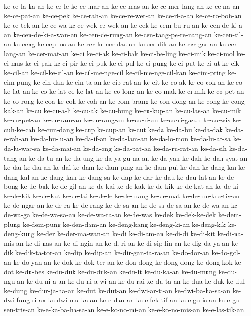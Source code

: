 {ke-ce-la-ka-an ke-ce-le ke-ce-mar-an ke-ce-mas-an ke-ce-mer-lang-an
ke-ce-na-an ke-ce-pat-an ke-ce-pek ke-ce-rah-an ke-ce-re-wet-an
ke-ce-ri-a-an ke-ce-ro-boh-an ke-ce-tek-an ke-ce-wa ke-ce-wek-ce-wek-an
ke-cek ke-cem-bu-ru-an ke-cen-de-ki-a-an ke-cen-de-ki-a-wan-an
ke-cen-de-rung-an ke-cen-tang-pe-re-nang-an ke-cen-til-an ke-ceng
ke-cep-los-an ke-cer ke-cer-das-an ke-cer-dik-an ke-cer-gas-an
ke-cer-lang-an ke-cer-mat-an ke-ci ke-ci-ak ke-ci-bak ke-ci-be-ling
ke-ci-mik ke-ci-mol ke-ci-mus ke-ci-pak ke-ci-pir ke-ci-puk ke-ci-pul
ke-ci-pung ke-ci-put ke-ci-ut ke-cik ke-cil-an ke-cil-ke-cil-an
ke-cil-me-nge-cil ke-cil-me-nge-cil-kan ke-cim-pring ke-cim-pung
ke-cin-dan ke-cin-ta-an ke-cip-rat-an ke-cit ke-co-ak ke-co-cok-an
ke-co-ke-lat-an ke-co-ke-lat-co-ke-lat-an ke-co-long-an
ke-co-mak-ke-ci-mik ke-co-pet-an ke-co-rong ke-coa ke-coh ke-coh-an
ke-com-brang ke-con-dong-an ke-cong ke-cong-kak-an ke-cu ke-cu-a-li
ke-cu-ak ke-cu-bung ke-cu-kup-an ke-cu-las-an ke-cu-mik ke-cu-pet-an
ke-cu-ram-an ke-cu-rang-an ke-cu-ri-an ke-cu-ri-ga-an ke-cu-wis
ke-cuh-ke-cah ke-cun-dang ke-cup ke-cup-an ke-cut ke-da ke-da-bu ke-da-dak
ke-da-e-rah-an ke-da-hu-lu-an ke-da-if-an ke-da-lam-an ke-da-lo-mon
ke-da-lu-ar-sa ke-da-lu-war-sa ke-da-mai-an ke-da-ong ke-da-pat-an
ke-da-ru-rat-an ke-da-sih ke-da-tang-an ke-da-tu-an ke-da-ung
ke-da-ya-gu-na-an ke-da-yan ke-dah ke-dah-syat-an ke-dai ke-dai-an ke-dal
ke-dam ke-dam-ping-an ke-dam-pul ke-dan ke-dang-kai ke-dang-kal-an
ke-dang-kan ke-dang-sa ke-dap ke-dar ke-dau ke-dau-lat-an ke-de-bong
ke-de-buk ke-de-gil-an ke-de-kai ke-de-kak-ke-de-kik ke-de-kat-an ke-de-ki
ke-de-kik ke-de-kut ke-de-lai ke-de-le ke-de-mang ke-de-mat
ke-de-mo-kra-tis-an ke-de-ngar-an ke-de-ra ke-de-rang ke-de-sa-an
ke-de-sa-de-sa-an ke-de-wa-an ke-de-wa-ga ke-de-wa-sa-an ke-de-wa-ta-an
ke-de-was ke-dek ke-dek-ke-dek ke-dem-plung ke-dem-pung ke-den-dam-an
ke-deng-kang ke-deng-ki-an ke-deng-kik ke-deng-kung ke-der
ke-der-ma-wan-an ke-di ke-di-am-an ke-di-di ke-di-kit ke-di-na-mis-an
ke-di-nas-an ke-di-ngin-an ke-di-ri-an ke-di-sip-lin-an ke-dig-da-ya-an
ke-dik ke-dik-ta-tor-an ke-dip ke-dip-an ke-dir-gan-ta-ra-an ke-do-dor-an
ke-do-gol-an ke-do-yan-an ke-dok ke-dok-ter-an ke-don-dong ke-dong-dong
ke-dong-kok ke-dot ke-du-bes ke-du-duk ke-du-duk-an ke-du-it ke-du-ka-an
ke-du-mung ke-du-ngu-an ke-du-ni-a-an ke-du-ni-a-wi-an ke-du-rai
ke-du-ta-an ke-dua ke-duk ke-dul ke-dung ke-dur-ja-na-an ke-dut ke-dut-an
ke-dwi-ar-ti-an ke-dwi-ba-ha-sa-an ke-dwi-fung-si-an ke-dwi-mu-ka-an
ke-e-dan-an ke-e-fek-tif-an ke-e-go-is-an ke-e-go-sen-tris-an
ke-e-ka-ba-ha-sa-an ke-e-ko-no-mi-an ke-e-ko-no-mis-an ke-e-las-tik-an
}

